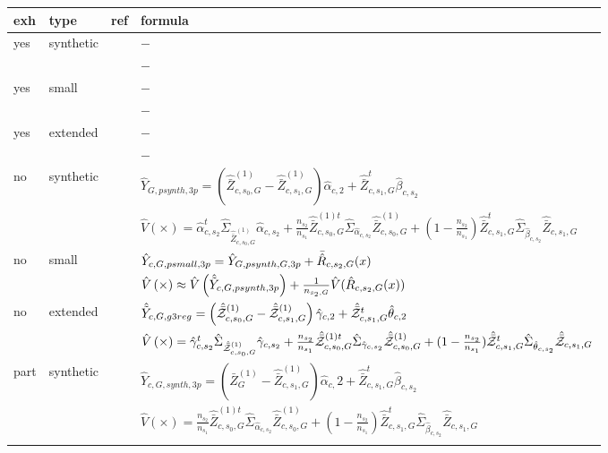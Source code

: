 \begin{table}
    \centering
\begin{tabular}{ l l r l}
	 exh 	&  type	&  ref & formula\\ \toprule
yes & synthetic & & $-$\\
 &  &  & $-$ \\
\lightrule
yes & small &  & $-$\\
 &  &  & $-$\\
\lightrule
yes & extended &  & $-$\\
 &  &  & $-$\\
\strongrule

	 no 	&  synthetic 	& \analogy{} & $\hat{Y}_{G,psynth,3p} = \left( \hat{\bar{Z}}_{c,s_0,G}^{(1)}- \hat{\bar{Z}}_{c,s_1,G}^{(1)}\right) \hat{\alpha}_{c,2} + \hat{\bar{Z}}^t_{c,s_1,G}\hat{\beta}_{c,s_2} $\\
	   	&    	&    \analogy{} & $ \hat{V}\left(\times\right) = \hat{\alpha}_{c,s_2}^t \hat{\Sigma}_{\hat{\bar{Z}}_{c,s_0,G}^{(1)}} \hat{\alpha}_{c,s_2} + \frac{n_{s_2}}{n_{s_1}} \hat{\bar{Z}}^{(1)t}_{c,s_0,G} \hat{\Sigma}_{ \hat{\alpha}_{c,s_2}} \hat{\bar{Z}}^{(1)}_{c,s_0,G} + (1-\frac{n_{s_2}}{n_{s_1}})\hat{\bar{Z}}^{t}_{c,s_1,G} \hat{\Sigma}_{ \hat{\beta}_{c,s_2}} \hat{\bar{Z}}_{c,s_1,G} $\\
\lightrule
			
 	 no 	&  small 	& \analogy{} & $ \hat{Y}_{c,G,psmall,3p} = \hat{Y}_{G,psynth,G,3p} + \bar{\hat{R}}_{c,s_2,G}(x)$\\
	    	&      	& \analogy{} & $ \hat{V}\left(\times\right) \approx \hat{V}\left(\hat{\tilde{Y}}_{c,G,psynth,3p}\right) + \frac{1}{n_{s_2,G}}\hat{V}(\hat{R}_{c,s_2,G}(x))$\\
\lightrule

     no 	&  extended 	& \cite[eq. 53]{Man13c.e} & $ \hat{\tilde{Y}}_{c,G,g3reg} = \left( \hat{\bar{\mathcal{Z}}}_{c,s_0,G}^{(1)}- \hat{\bar{\mathcal{Z}}}_{c,s_1,G}^{(1)}\right) \hat{\gamma}_{c,2} + \hat{\bar{\mathcal{Z}}}^t_{c,s_1,G}\hat{\theta}_{c,2}$\\
        &    	&     \cite[eq. 55]{Man13c.e} & $\hat{V}\left(\times\right) = \hat{\gamma}_{c,s_2}^t \hat{\Sigma}_{\hat{\bar{\mathcal{Z}}}_{c,s_0,G}^{(1)}} \hat{\gamma}_{c,s_2} + \frac{n_{s_2}}{n_{s_1}} \hat{\bar{\mathcal{Z}}}^{(1)t}_{c,s_0,G} \hat{\Sigma}_{ \hat{\gamma}_{c,s_2}} \hat{\bar{\mathcal{Z}}}^{(1)}_{c,s_0,G} + (1-\frac{n_{s_2}}{n_{s_1}})\hat{\bar{\mathcal{Z}}}^{t}_{c,s_1,G} \hat{\Sigma}_{ \hat{\theta}_{c,s_2}} \hat{\bar{\mathcal{Z}}}_{c,s_1,G} $\\
\strongrule
	 part 	&  synthetic 	& \analogy{} & $\hat{Y}_{c,G,synth,3p} = \left(
\bar{Z}_{G}^{(1)}- \hat{\bar{Z}}_{c,s_1,G}^{(1)}\right) \hat{\alpha}_{c,}2 + \hat{\bar{Z}}^t_{c,s_1,G}\hat{\beta}_{c,s_2} $\\
	   	&    	&    \analogy{} & $ \hat{V}\left(\times\right) = \frac{n_{s_2}}{n_{s_1}} \hat{\bar{Z}}^{(1)t}_{c,s_0,G} \hat{\Sigma}_{ \hat{\alpha}_{c,s_2}} \hat{\bar{Z}}^{(1)}_{c,s_0,G} + (1-\frac{n_{s_2}}{n_{s_1}})\hat{\bar{Z}}^{t}_{c,s_1,G} \hat{\Sigma}_{ \hat{\beta}_{c,s_2}} \hat{\bar{Z}}_{c,s_1,G} $\\
\lightrule
			

\end{tabular}
\end{table}
